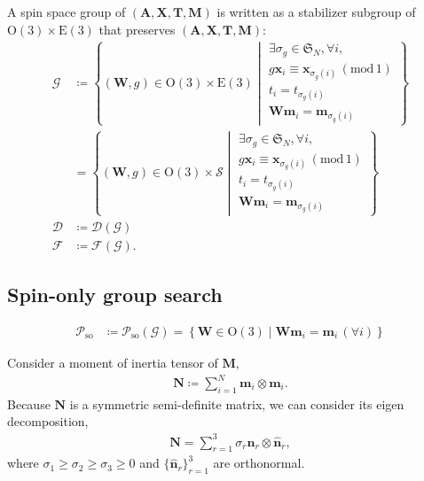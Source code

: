 \documentclass[a4paper, 11pt]{article}
\theoremstyle{definition}
\newcommand{\relmiddle}[1]{\mathrel{}\middle#1\mathrel{}}
\newcommand{\set}[2]{\left\{ #1 \relmiddle| #2 \right\}}
\begin{document}
A spin space group of $(\bm{A}, \bm{X}, \bm{T}, \bm{M})$ is written as a stabilizer subgroup of $\mathrm{O}(3) \times \mathrm{E}(3)$ that preserves $(\bm{A}, \bm{X}, \bm{T}, \bm{M})$:
\begin{align}
  \mathcal{G}
    &\coloneqq \set{
      (\bm{W}, g) \in \mathrm{O}(3) \times \mathrm{E}(3)
    }{
        \begin{array}{l}
          \exists \sigma_{g} \in \mathfrak{S}_{N}, \forall i, \\
          g \bm{x}_{i} \equiv \bm{x}_{\sigma_{g}(i)} \, (\mathrm{mod} \, 1) \\
          t_{i} = t_{\sigma_{g}(i)} \\
          \bm{W} \bm{m}_{i} = \bm{m}_{\sigma_{g}(i)}
        \end{array}
    } \\
    &= \set{
      (\bm{W}, g) \in \mathrm{O}(3) \times \mathcal{S}
    }{
        \begin{array}{l}
          \exists \sigma_{g} \in \mathfrak{S}_{N}, \forall i, \\
          g \bm{x}_{i} \equiv \bm{x}_{\sigma_{g}(i)} \, (\mathrm{mod} \, 1) \\
          t_{i} = t_{\sigma_{g}(i)} \\
          \bm{W} \bm{m}_{i} = \bm{m}_{\sigma_{g}(i)}
        \end{array}
    } \\
  \mathcal{D} &\coloneqq \mathcal{D}(\mathcal{G}) \\
  \mathcal{F} &\coloneqq \mathcal{F}(\mathcal{G}).
\end{align}

\subsection{Spin-only group search}

\begin{align}
  \mathcal{P}_{\mathrm{so}}
    &\coloneqq \mathcal{P}_{\mathrm{so}}(\mathcal{G})
    = \set{
        \bm{W} \in \mathrm{O}(3)
      }{
        \bm{W} \bm{m}_{i} = \bm{m}_{i} \,(\forall i)
      }
\end{align}

Consider a moment of inertia tensor of $\bm{M}$,
\begin{align}
  \bm{N} \coloneqq \sum_{i=1}^{N} \bm{m}_{i} \otimes \bm{m}_{i}.
\end{align}
Because $\bm{N}$ is a symmetric semi-definite matrix, we can consider its eigen decomposition,
\begin{align}
  \bm{N} = \sum_{r=1}^{3} \sigma_{r} \hat{\bm{n}}_{r} \otimes \hat{\bm{n}}_{r},
\end{align}
where $\sigma_{1} \geq \sigma_{2} \geq \sigma_{3} \geq 0$ and $\{ \hat{\bm{n}}_{r} \}_{r=1}^{3}$ are orthonormal.
\end{document}
